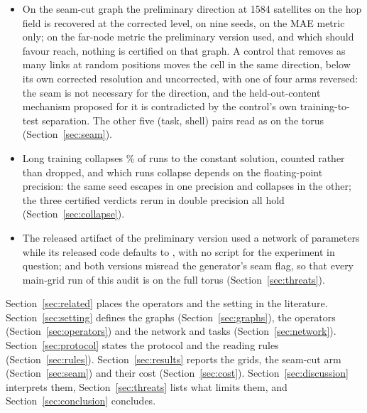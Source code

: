 \documentclass[preprint,11pt,3p]{elsarticle}
\begin{document}
\begin{itemize}
  \numPowerCannotReject{} of them at any effect size and is reported as description. Against the
  best tuned fixed-reach baseline, a learned propagation time in its best arm is ahead by
  \numLadderGapBestPctHopsShellOne\% at 1584 satellites on the hop field and behind in its worst
  arm; the first draft's 53\% margin was measured against a baseline that had half-failed to
  train.
\item On the seam-cut graph the preliminary direction at 1584 satellites on the hop field is
  recovered at the corrected level, on nine seeds, on the MAE metric only; on the far-node metric
  the preliminary version used, and which should favour reach, nothing is certified on that
  graph. A control that removes as many links at random positions moves the cell in the same
  direction, below its own corrected resolution and uncorrected, with one of four arms reversed:
  the seam is not necessary for the direction, and the held-out-content mechanism proposed for
  it is contradicted by the control's own training-to-test separation. The other five
  (task, shell) pairs read as on the torus (Section~\ref{sec:seam}).
\item Long training collapses \numGridThreePathologyPct\% of runs to the constant solution,
  counted rather than dropped, and which runs collapse depends on the floating-point precision:
  the same seed escapes in one precision and collapses in the other; the three certified
  verdicts rerun in double precision all hold (Section~\ref{sec:collapse}).
\item The released artifact of the preliminary version used a network of \numPrelimParams{}
  parameters while its released code defaults to \numReleasedParams{}, with no script for the
  experiment in question; and both versions misread the generator's seam flag, so that every
  main-grid run of this audit is on the full torus (Section~\ref{sec:threats}).
\end{itemize}

Section~\ref{sec:related} places the operators and the setting in the literature.
Section~\ref{sec:setting} defines the graphs (Section~\ref{sec:graphs}), the operators
(Section~\ref{sec:operators}) and the network and tasks (Section~\ref{sec:network}).
Section~\ref{sec:protocol} states the protocol and the reading rules (Section~\ref{sec:rules}).
Section~\ref{sec:results} reports the grids, the seam-cut arm (Section~\ref{sec:seam}) and
their cost (Section~\ref{sec:cost}).
Section~\ref{sec:discussion} interprets them, Section~\ref{sec:threats} lists what limits them, and
Section~\ref{sec:conclusion} concludes.
\end{document}
